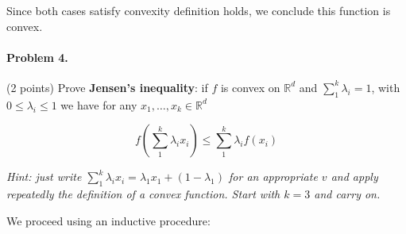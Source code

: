 \documentclass[12pt]{scrartcl}
\begin{document}
Since both cases satisfy convexity definition holds, we conclude this function is convex.

\vspace{0.5em}




\begin{boxF}
\paragraph*{Problem 4.} (2 points) \hspace{0.15em} Prove \textbf{Jensen's inequality}: if $f$ is convex on $\mathbb{R}^d$ and $\sum_1^k \lambda_i = 1$, with $0 \leq \lambda_i \leq 1$ we have for any $x_1, \dots, x_k \in \mathbb{R}^d$

    $$
    f\left(\sum_1^k \lambda_i x_i\right) \leq \sum_1^k \lambda_i f(x_i)
    $$

\textit{Hint: just write $\sum_1^k \lambda_i x_i = \lambda_1 x_1 + \left( 1 - \lambda_1\right)$ for an appropriate $v$ and apply repeatedly the definition of a convex function. Start with $k = 3$ and carry on.}

\end{boxF}

We proceed using an inductive procedure:
\end{document}
